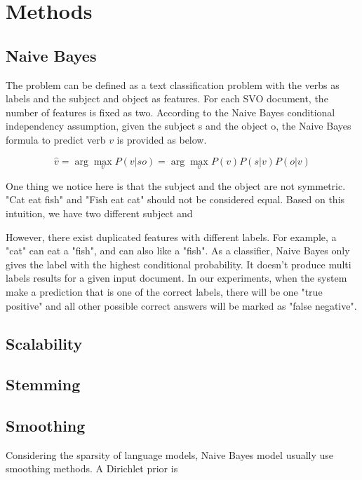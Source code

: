 \section{Methods}

\subsection{Naive Bayes}

The problem can be defined as a text classification problem with the verbs as labels and the subject and object as features. For each SVO document, the number of features is fixed as two. According to the Naive Bayes conditional independency assumption, given the subject s and the object o, the Naive Bayes formula to predict verb $v$ is provided as below.

\begin{equation}
	\hat{v} = \arg\max_v P(v|so) = \arg\max_v P(v)P(s|v)P(o|v)
\end{equation}

One thing we notice here is that the subject and the object are not symmetric. "Cat eat fish" and "Fish eat cat" should not be considered equal. Based on this intuition, we have two different subject and 

However, there exist duplicated features with different labels. For example, a "cat" can eat a "fish", and can also like a "fish". As a classifier, Naive Bayes only gives the label with the highest conditional probability. It doesn't produce multi labels results for a given input document. In our experiments, when the system make a prediction that is one of the correct labels, there will be one "true positive" and all other possible correct answers will be marked as "false negative".

\subsection{Scalability}


\subsection{Stemming}

\subsection{Smoothing}

Considering the sparsity of language models, Naive Bayes model usually use smoothing methods. A Dirichlet prior is 

